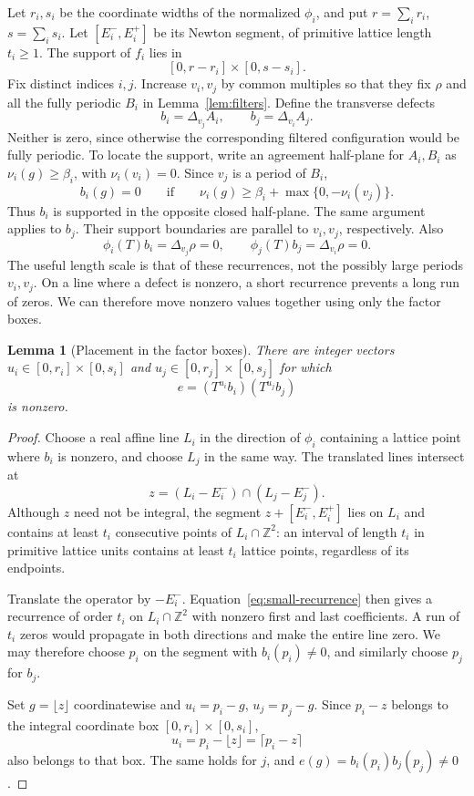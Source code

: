 \documentclass[11pt]{article}
\numberwithin{equation}{section}
\newtheorem{lemma}[theorem]{Lemma}
\theoremstyle{definition}
\theoremstyle{remark}
\newcommand{\Z}{\mathbb Z}
\newcommand{\Del}[1]{\Delta_{#1}}
\begin{document}
Let $r_i,s_i$ be the coordinate widths of the normalized $\phi_i$, and put $r=\sum_i r_i$, $s=\sum_i
s_i$. Let $[E_i^-,E_i^+]$ be its Newton segment, of primitive lattice length $t_i\ge1$. The support
of $f_i$ lies in
\[
 [0,r-r_i]\times[0,s-s_i].
\]
Fix distinct indices $i,j$. Increase $v_i,v_j$ by common multiples so that they fix $\rho$ and all
the fully periodic $B_i$ in Lemma~\ref{lem:filters}. Define the transverse defects
\[
 b_i=\Del{v_j}A_i,\qquad b_j=\Del{v_i}A_j.
\]
Neither is zero, since otherwise the corresponding filtered configuration would be fully periodic.
To locate the support, write an agreement half-plane for $A_i,B_i$ as $\nu_i(g)\ge\beta_i$, with
$\nu_i(v_i)=0$. Since $v_j$ is a period of $B_i$,
\[
 b_i(g)=0\qquad\text{if}\qquad
 \nu_i(g)\ge\beta_i+\max\{0,-\nu_i(v_j)\}.
\]
Thus $b_i$ is supported in the opposite closed half-plane. The same argument applies to $b_j$. Their
support boundaries are parallel to $v_i,v_j$, respectively. Also
\begin{equation}\label{eq:small-recurrence}
 \phi_i(T)b_i=\Del{v_j}\rho=0,\qquad
 \phi_j(T)b_j=\Del{v_i}\rho=0.
\end{equation}
The useful length scale is that of these recurrences, not the possibly large periods $v_i,v_j$.
On a line where a defect is nonzero, a short recurrence prevents a long run of zeros. We can
therefore move nonzero values together using only the factor boxes.

\begin{lemma}[Placement in the factor boxes]\label{lem:placement}
There are integer vectors $u_i\in[0,r_i]\times[0,s_i]$ and $u_j\in[0,r_j]\times[0,s_j]$ for which
\[
 e=(T^{u_i}b_i)(T^{u_j}b_j)
\]
is nonzero.
\end{lemma}
\begin{proof}
Choose a real affine line $L_i$ in the direction of $\phi_i$ containing a lattice point where $b_i$
is nonzero, and choose $L_j$ in the same way. The translated lines intersect at
\[
 z=(L_i-E_i^-)\cap(L_j-E_j^-).
\]
Although $z$ need not be integral, the segment $z+[E_i^-,E_i^+]$ lies on $L_i$ and contains at least
$t_i$ consecutive points of $L_i\cap\Z^2$: an interval of length $t_i$ in primitive lattice units
contains at least $t_i$ lattice points, regardless of its endpoints.

Translate the operator by $-E_i^-$. Equation~\eqref{eq:small-recurrence} then gives a recurrence of
order $t_i$ on $L_i\cap\Z^2$ with nonzero first and last coefficients. A run of $t_i$ zeros would
propagate in both directions and make the entire line zero. We may therefore choose $p_i$ on the
segment with $b_i(p_i)\ne0$, and similarly choose $p_j$ for $b_j$.

Set $g=\lfloor z\rfloor$ coordinatewise and $u_i=p_i-g$, $u_j=p_j-g$. Since $p_i-z$ belongs to the
integral coordinate box $[0,r_i]\times[0,s_i]$,
\[
 u_i=p_i-\lfloor z\rfloor=\lceil p_i-z\rceil
\]
also belongs to that box. The same holds for $j$, and $e(g)=b_i(p_i)b_j(p_j)\ne0$.
\end{proof}
\end{document}
